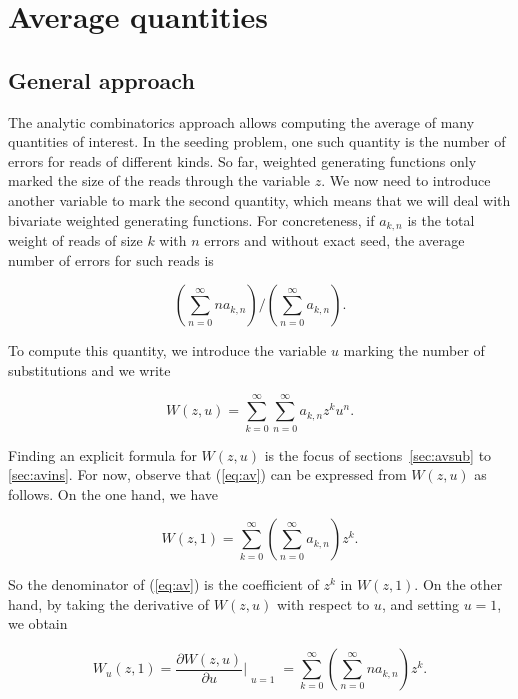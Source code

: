 \documentclass{article}
\begin{document}
\section{Average quantities}
\label{sec:av}

\subsection{General approach}
\label{sec:genapp}


The analytic combinatorics approach allows computing the average of many
quantities of interest. In the seeding problem, one such quantity is the
number of errors for reads of different kinds. So far, weighted generating
functions only marked the size of the reads through the variable $z$. We
now need to introduce another variable to mark the second quantity, which
means that we will deal with bivariate weighted generating functions. For
concreteness, if $a_{k,n}$ is the total weight of reads of size $k$
with $n$ errors and without exact seed, the average number of errors for
such reads is


\begin{equation}
\label{eq:av}
\left( \sum_{n=0}^\infty na_{k,n} \right) \Big/
 \left( \sum_{n=0}^\infty a_{k,n} \right).
\end{equation}

To compute this quantity, we introduce the variable $u$ marking the number
of substitutions and we write

\begin{equation*}
W(z,u) = \sum_{k=0}^\infty\sum_{n=0}^\infty a_{k,n}z^ku^n.
\end{equation*}

Finding an explicit formula for $W(z,u)$ is the focus of
sections~\ref{sec:avsub} to \ref{sec:avins}. For now, observe that
(\ref{eq:av}) can be expressed from $W(z,u)$ as follows. On the
one hand, we have

\begin{equation*}
W(z,1) = \sum_{k=0}^\infty \left( \sum_{n=0}^\infty a_{k,n} \right) z^k.
\end{equation*}

So the denominator of (\ref{eq:av}) is the coefficient of $z^k$ in
$W(z,1)$. On the other hand, by taking the derivative of $W(z,u)$ with
respect to $u$, and setting $u=1$, we obtain

\begin{equation*}
W_u(z,1) = \frac{\partial W(z,u)}{\partial u} \Bigr|_{\substack{\\u=1}} =
\sum_{k=0}^\infty \left( \sum_{n=0}^\infty na_{k,n} \right) z^k.
\end{equation*}
\end{document}

